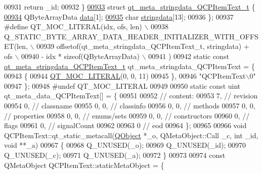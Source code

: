 \begin{DoxyCode}
00931     \textcolor{keywordflow}{return} \_id;
00932 \}
\hypertarget{a00067_source_l00933}{}\hyperlink{a00067}{00933} \textcolor{keyword}{struct }\hyperlink{a00067_d5/d13/a00205}{qt\_meta\_stringdata\_QCPItemText\_t} \{
\hypertarget{a00067_source_l00934}{}\hyperlink{a00067_ae37b5edc1ab54bceebcfba0fb33002ec}{00934}     QByteArrayData \hyperlink{a00067_ae37b5edc1ab54bceebcfba0fb33002ec}{data}[1];
\hypertarget{a00067_source_l00935}{}\hyperlink{a00067_aff2bfa25f79dd85cdbd854d9e51371a9}{00935}     \textcolor{keywordtype}{char} \hyperlink{a00067_aff2bfa25f79dd85cdbd854d9e51371a9}{stringdata}[13];
00936 \};
00937 \textcolor{preprocessor}{#define QT\_MOC\_LITERAL(idx, ofs, len) \(\backslash\)}
00938 \textcolor{preprocessor}{    Q\_STATIC\_BYTE\_ARRAY\_DATA\_HEADER\_INITIALIZER\_WITH\_OFFSET(len, \(\backslash\)}
00939 \textcolor{preprocessor}{    offsetof(qt\_meta\_stringdata\_QCPItemText\_t, stringdata) + ofs \(\backslash\)}
00940 \textcolor{preprocessor}{        - idx * sizeof(QByteArrayData) \(\backslash\)}
00941 \textcolor{preprocessor}{    )}
00942 \textcolor{keyword}{static} \textcolor{keyword}{const} \hyperlink{a00067_d5/d13/a00205}{qt\_meta\_stringdata\_QCPItemText\_t} 
      qt\_meta\_stringdata\_QCPItemText = \{
00943     \{
00944 \hyperlink{a00067_a75bb9482d242cde0a06c9dbdc6b83abe}{QT\_MOC\_LITERAL}(0, 0, 11)
00945     \},
00946     \textcolor{stringliteral}{"QCPItemText\(\backslash\)0"}
00947 \};
00948 \textcolor{preprocessor}{#undef QT\_MOC\_LITERAL}
00949 
00950 \textcolor{keyword}{static} \textcolor{keyword}{const} uint qt\_meta\_data\_QCPItemText[] = \{
00951 
00952  \textcolor{comment}{// content:}
00953        7,       \textcolor{comment}{// revision}
00954        0,       \textcolor{comment}{// classname}
00955        0,    0, \textcolor{comment}{// classinfo}
00956        0,    0, \textcolor{comment}{// methods}
00957        0,    0, \textcolor{comment}{// properties}
00958        0,    0, \textcolor{comment}{// enums/sets}
00959        0,    0, \textcolor{comment}{// constructors}
00960        0,       \textcolor{comment}{// flags}
00961        0,       \textcolor{comment}{// signalCount}
00962 
00963        0        \textcolor{comment}{// eod}
00964 \};
00965 
00966 \textcolor{keywordtype}{void} QCPItemText::qt\_static\_metacall(\hyperlink{a00059}{QObject} *\_o, QMetaObject::Call \_c, \textcolor{keywordtype}{int} \_id, \textcolor{keywordtype}{void} **\_a)
00967 \{
00968     Q\_UNUSED(\_o);
00969     Q\_UNUSED(\_id);
00970     Q\_UNUSED(\_c);
00971     Q\_UNUSED(\_a);
00972 \}
00973 
00974 \textcolor{keyword}{const} QMetaObject QCPItemText::staticMetaObject = \{

\end{DoxyCode}
